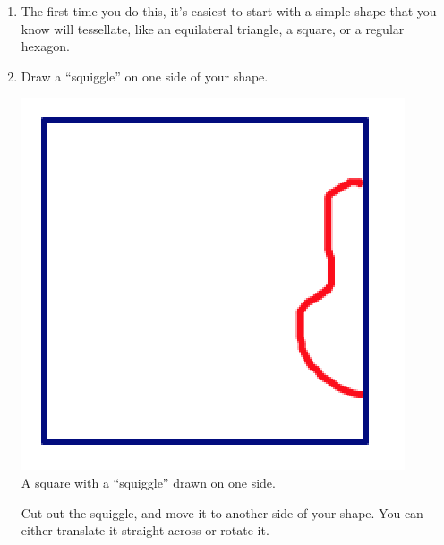 \begin{enumerate}

\item
The first time you do this, it's easiest to start with a simple shape that you know will tessellate, like an equilateral triangle, a square, or a regular hexagon.\\

\item
Draw a ``squiggle'' on one side of your shape.  

\begin{center}
\includegraphics[scale=0.5]{eschdirect1}\\
A square with a ``squiggle'' drawn on one side.

\end{center}
Cut out the squiggle, and move it to another side of your shape.  You can either translate it straight across or rotate it.  


\end{enumerate}
